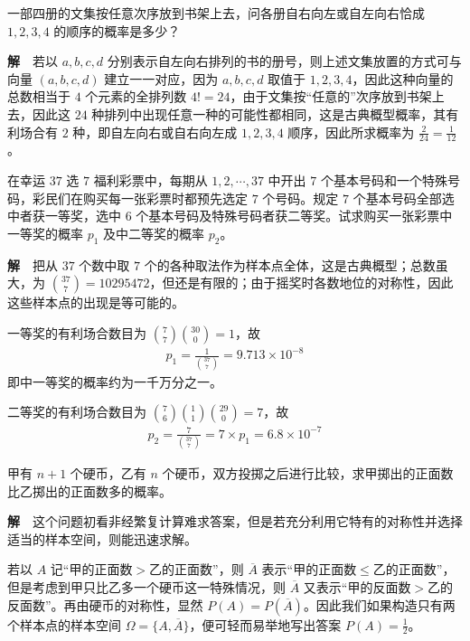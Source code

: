 \documentclass[../../main.tex]{subfiles}
\begin{document}
\begin{example}[文集排列]\label{example:ch01-文集排列}
一部四册的文集按任意次序放到书架上去，问各册自右向左或自左向右恰成 $1,2,3,4$ 的顺序的概率是多少？

\textbf{解}~~若以 $a,b,c,d$ 分别表示自左向右排列的书的册号，则上述文集放置的方式可与向量 $(a,b,c,d)$ 建立一一对应，因为 $a,b,c,d$ 取值于 $1,2,3,4$，因此这种向量的总数相当于 $4$ 个元素的全排列数 $4!=24$，由于文集按“任意的”次序放到书架上去，因此这 $24$ 种排列中出现任意一种的可能性都相同，这是古典概型概率，其有利场合有 $2$ 种，即自左向右或自右向左成 $1,2,3,4$ 顺序，因此所求概率为 $\frac{2}{24}=\frac{1}{12}$。
\end{example}

\begin{example}[幸运37选7]\label{example:ch01-彩票}
在幸运 $37$ 选 $7$ 福利彩票中，每期从 $1,2,\cdots,37$ 中开出 $7$ 个基本号码和一个特殊号码，彩民们在购买每一张彩票时都预先选定 $7$ 个号码。规定 $7$ 个基本号码全部选中者获一等奖，选中 $6$ 个基本号码及特殊号码者获二等奖。试求购买一张彩票中一等奖的概率 $p_1$ 及中二等奖的概率 $p_2$。

\textbf{解}~~把从 $37$ 个数中取 $7$ 个的各种取法作为样本点全体，这是古典概型；总数虽大，为 $\binom{37}{7}=10295472$，但还是有限的；由于摇奖时各数地位的对称性，因此这些样本点的出现是等可能的。

一等奖的有利场合数目为 $\binom{7}{7}\binom{30}{0}=1$，故
\begin{align*}
p_1=\frac{1}{\binom{37}{7}}=9.713\times 10^{-8}
\end{align*}
即中一等奖的概率约为一千万分之一。

二等奖的有利场合数目为 $\binom{7}{6}\binom{1}{1}\binom{29}{0}=7$，故
\begin{align*}
p_2=\frac{7}{\binom{37}{7}}=7\times p_1=6.8\times 10^{-7}
\end{align*}
\end{example}

\begin{example}[硬币比较]\label{example:ch01-硬币比较}
甲有 $n+1$ 个硬币，乙有 $n$ 个硬币，双方投掷之后进行比较，求甲掷出的正面数比乙掷出的正面数多的概率。

\textbf{解}~~这个问题初看非经繁复计算难求答案，但是若充分利用它特有的对称性并选择适当的样本空间，则能迅速求解。

若以 $A$ 记“甲的正面数$>$乙的正面数”，则 $\overline{A}$ 表示“甲的正面数$\leqslant$乙的正面数”，但是考虑到甲只比乙多一个硬币这一特殊情况，则 $\overline{A}$ 又表示“甲的反面数$>$乙的反面数”。再由硬币的对称性，显然 $P(A)=P(\overline{A})$。因此我们如果构造只有两个样本点的样本空间 $\Omega=\{A,\overline{A}\}$，便可轻而易举地写出答案 $P(A)=\frac{1}{2}$。
\end{example}
\end{document}
